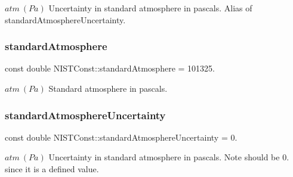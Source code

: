 $atm \ (Pa)$ Uncertainty in standard atmosphere in pascals. Alias of standard\+Atmosphere\+Uncertainty. \mbox{\label{group___n_i_s_t_const-_standard_atmosphere_ga260e00232ff2d0d8a24bdbf7f6c87b4e}} 
\subsubsection{\texorpdfstring{standard\+Atmosphere}{standardAtmosphere}}
{\footnotesize\ttfamily const double N\+I\+S\+T\+Const\+::standard\+Atmosphere = 101325.}

$atm \ (Pa)$ Standard atmosphere in pascals. \mbox{\label{group___n_i_s_t_const-_standard_atmosphere_ga784dc63051d7f1dca50f4f2843c8fbcf}} 
\subsubsection{\texorpdfstring{standard\+Atmosphere\+Uncertainty}{standardAtmosphereUncertainty}}
{\footnotesize\ttfamily const double N\+I\+S\+T\+Const\+::standard\+Atmosphere\+Uncertainty = 0.}

$atm \ (Pa)$ Uncertainty in standard atmosphere in pascals. Note should be 0. since it is a defined value. 